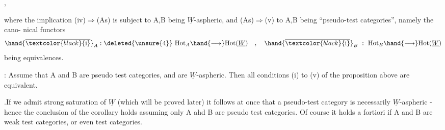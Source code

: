 
\margin{(*)}
 ,

where the implication (iv)$\Rightarrow$(As)   is subject to  A,B  being $\underline{W}$-aspheric,
and  (As)$\Rightarrow$(v) to  A,B  being ``pseudo-test categories'', namely the cano-%
nical functors
\[ \hand{\overline{\textcolor{black}{\mathrm{i}}}}_A : \deleted{\unsure{4}}\ \mathrm{Hot}_A \hand{\longrightarrow} \mathrm{Hot}(\underline{W}) \quad , \quad \hand{\overline{\textcolor{black}{\mathrm{i}}}}_B \ : \ \mathrm{Hot}_B \hand{\longrightarrow} \mathrm{Hot}(\underline{W}) \]
being equivalences.

\hand{\uline{\textcolor{black}{Corollary}}}:  Assume that A and B are pseudo test categories,  and are
$\underline{W}$-aspheric.  Then  all conditions (i) to (v) of the proposition above are
equivalent.

.If we admit strong saturation of $\underline{W}$  (which will be proved later)\hand{,}
it follows at once that  a pseudo-test category is 
necessarily $\underline{W}$-aspheric  -  hence the conclusion of the corollary holds
assuming only A ahd B are pseudo test categories.  Of course it holds a
fortiori if A and B are weak test categories,  or even test categories.

